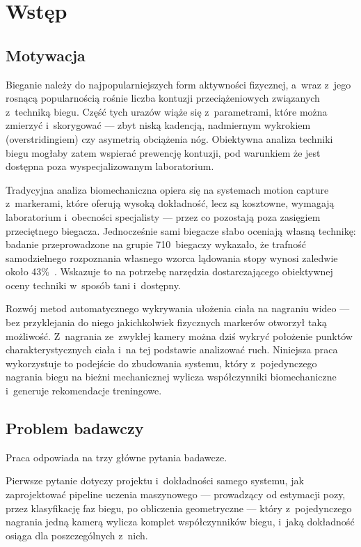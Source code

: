 \chapter{Wstęp}
\label{ch:wstep}

\section{Motywacja}
\label{sec:motywacja}

Bieganie należy do najpopularniejszych form aktywności fizycznej, a~wraz z~jego rosnącą popularnością rośnie liczba kontuzji przeciążeniowych związanych z~techniką biegu. Część tych urazów wiąże się z~parametrami, które można zmierzyć i~skorygować --- zbyt niską kadencją, nadmiernym wykrokiem (overstridingiem) czy asymetrią obciążenia nóg. Obiektywna analiza techniki biegu mogłaby zatem wspierać prewencję kontuzji, pod warunkiem że jest dostępna poza wyspecjalizowanym laboratorium.

Tradycyjna analiza biomechaniczna opiera się na systemach motion capture z~markerami, które oferują wysoką dokładność, lecz są kosztowne, wymagają laboratorium i~obecności specjalisty --- przez co pozostają poza zasięgiem przeciętnego biegacza. Jednocześnie sami biegacze słabo oceniają własną technikę: badanie przeprowadzone na grupie 710~biegaczy wykazało, że trafność samodzielnego rozpoznania własnego wzorca lądowania stopy wynosi zaledwie około 43\%~\cite{vincent2024footstrike}. Wskazuje to na potrzebę narzędzia dostarczającego obiektywnej oceny techniki w~sposób tani i~dostępny.

Rozwój metod automatycznego wykrywania ułożenia ciała na nagraniu wideo --- bez przyklejania do niego jakichkolwiek fizycznych markerów otworzył taką możliwość. Z~nagrania ze~zwykłej kamery można dziś wykryć położenie punktów charakterystycznych ciała i~na tej podstawie analizować ruch. Niniejsza praca wykorzystuje to podejście do zbudowania systemu, który z~pojedynczego nagrania biegu na bieżni mechanicznej wylicza współczynniki biomechaniczne i~generuje rekomendacje treningowe. 
\newpage
\section{Problem badawczy}
\label{sec:problem-badawczy}

Praca odpowiada na trzy główne pytania badawcze.

Pierwsze pytanie dotyczy projektu i~dokładności samego systemu, jak zaprojektować pipeline uczenia maszynowego --- prowadzący od estymacji pozy, przez klasyfikację faz biegu, po obliczenia geometryczne --- który z~pojedynczego nagrania jedną kamerą wylicza komplet współczynników biegu, i~jaką dokładność osiąga dla poszczególnych z~nich.

